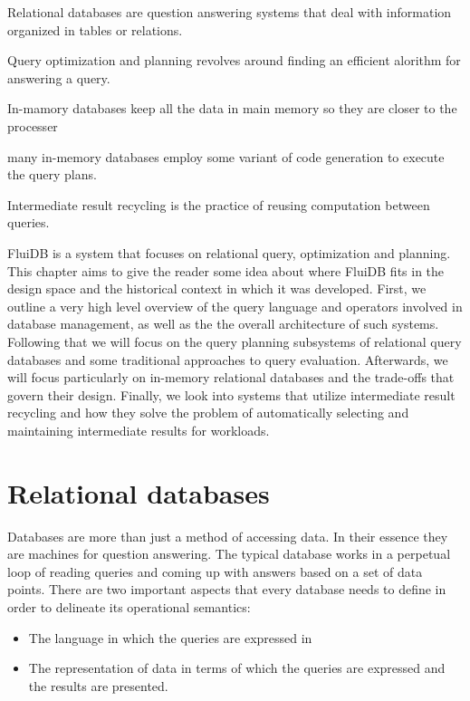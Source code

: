 \begin{summary}
\item Relational databases are question answering systems that deal
  with information organized in tables or relations.
\item Query optimization and planning revolves around finding an
  efficient alorithm for answering a query.
\item In-mamory databases keep all the data in main memory so they are
  closer to the processer
\item many in-memory databases employ some variant of code generation
  to execute the query plans.
\item Intermediate result recycling is the practice of reusing
  computation between queries.
\end{summary}

FluiDB is a system that focuses on relational query, optimization and
planning. This chapter aims to give the reader some idea about where
FluiDB fits in the design space and the historical context in which
it was developed.  First, we outline a very high level overview of the
query language and operators involved in database management, as well
as the the overall architecture of such systems. Following that we
will focus on the query planning subsystems of relational query
databases and some traditional approaches to query
evaluation. Afterwards, we will focus particularly on in-memory
relational databases and the trade-offs that govern their
design. Finally, we look into systems that utilize intermediate result
recycling and how they solve the problem of automatically selecting
and maintaining intermediate results for workloads.

\section{Relational databases}

Databases are more than just a method of accessing data. In their
essence they are machines for question answering. The typical database
works in a perpetual loop of reading queries and coming up with
answers based on a set of data points. There are two important aspects
that every database needs to define in order to delineate its
operational semantics:

\begin{itemize}
\item The language in which the queries are expressed in
\item The representation of data in terms of which the queries are
  expressed and the results are presented.
\end{itemize}

